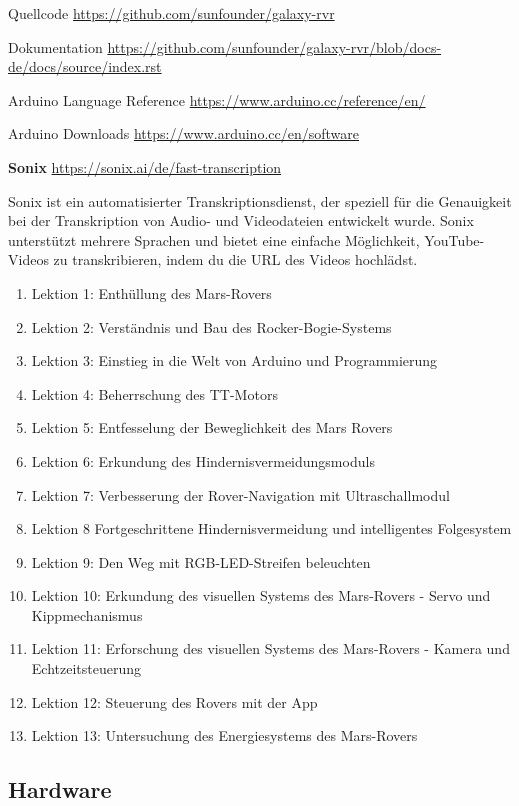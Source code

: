 \documentclass{vorlage-design-main}
\begin{document}
Quellcode \url{https://github.com/sunfounder/galaxy-rvr}

Dokumentation
\url{https://github.com/sunfounder/galaxy-rvr/blob/docs-de/docs/source/index.rst}

Arduino Language Reference \url{https://www.arduino.cc/reference/en/}

Arduino Downloads \url{https://www.arduino.cc/en/software}

\textbf{Sonix} \url{https://sonix.ai/de/fast-transcription}

Sonix ist ein automatisierter Transkriptionsdienst, der speziell für die
Genauigkeit bei der Transkription von Audio- und Videodateien entwickelt
wurde. Sonix unterstützt mehrere Sprachen und bietet eine einfache
Möglichkeit, YouTube-Videos zu transkribieren, indem du die URL des
Videos hochlädst.

\begin{enumerate}
\def\labelenumi{\arabic{enumi}.}

\item
  Lektion 1: Enthüllung des Mars-Rovers
\item
  Lektion 2: Verständnis und Bau des Rocker-Bogie-Systems
\item
  Lektion 3: Einstieg in die Welt von Arduino und Programmierung
\item
  Lektion 4: Beherrschung des TT-Motors
\item
  Lektion 5: Entfesselung der Beweglichkeit des Mars Rovers
\item
  Lektion 6: Erkundung des Hindernisvermeidungsmoduls
\item
  Lektion 7: Verbesserung der Rover-Navigation mit Ultraschallmodul
\item
  Lektion 8 Fortgeschrittene Hindernisvermeidung und intelligentes
  Folgesystem
\item
  Lektion 9: Den Weg mit RGB-LED-Streifen beleuchten
\item
  Lektion 10: Erkundung des visuellen Systems des Mars-Rovers - Servo
  und Kippmechanismus
\item
  Lektion 11: Erforschung des visuellen Systems des Mars-Rovers - Kamera
  und Echtzeitsteuerung
\item
  Lektion 12: Steuerung des Rovers mit der App
\item
  Lektion 13: Untersuchung des Energiesystems des Mars-Rovers
\end{enumerate}

\hypertarget{hardware}{%
\subsection{Hardware}\label{hardware}}
\end{document}
